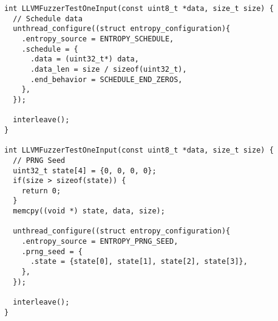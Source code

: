 \documentclass{article}
\begin{document}
\begin{verbatim}
int LLVMFuzzerTestOneInput(const uint8_t *data, size_t size) {
  // Schedule data
  unthread_configure((struct entropy_configuration){
    .entropy_source = ENTROPY_SCHEDULE,
    .schedule = {
      .data = (uint32_t*) data,
      .data_len = size / sizeof(uint32_t),
      .end_behavior = SCHEDULE_END_ZEROS,
    },
  });
  
  interleave();
}

int LLVMFuzzerTestOneInput(const uint8_t *data, size_t size) {
  // PRNG Seed
  uint32_t state[4] = {0, 0, 0, 0};
  if(size > sizeof(state)) {
    return 0;
  }
  memcpy((void *) state, data, size);
  
  unthread_configure((struct entropy_configuration){
    .entropy_source = ENTROPY_PRNG_SEED,
    .prng_seed = {
      .state = {state[0], state[1], state[2], state[3]},
    },
  });
  
  interleave();
}
\end{verbatim}
\end{document}
